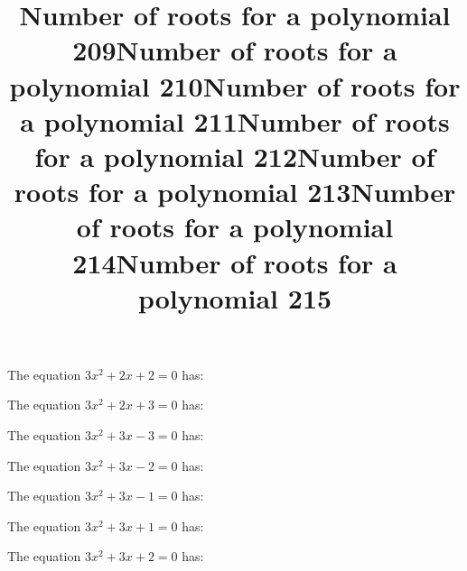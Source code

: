 \documentclass{article}
\begin{document}
\begin{category}
\begin{question}[multichoice]
\end{question}
\begin{question}[multichoice]
\title{Number of roots for a polynomial 209}
The equation $3 x^{2} + 2 x + 2=0$ has:



\end{question}
\begin{question}[multichoice]
\title{Number of roots for a polynomial 210}
The equation $3 x^{2} + 2 x + 3=0$ has:



\end{question}
\begin{question}[multichoice]
\title{Number of roots for a polynomial 211}
The equation $3 x^{2} + 3 x - 3=0$ has:



\end{question}
\begin{question}[multichoice]
\title{Number of roots for a polynomial 212}
The equation $3 x^{2} + 3 x - 2=0$ has:



\end{question}
\begin{question}[multichoice]
\title{Number of roots for a polynomial 213}
The equation $3 x^{2} + 3 x - 1=0$ has:



\end{question}
\begin{question}[multichoice]
\title{Number of roots for a polynomial 214}
The equation $3 x^{2} + 3 x + 1=0$ has:



\end{question}
\begin{question}[multichoice]
\title{Number of roots for a polynomial 215}
The equation $3 x^{2} + 3 x + 2=0$ has:


\end{question}
\end{category}
\end{document}
